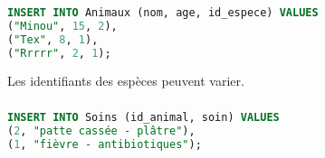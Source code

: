 \documentclass[svgnames,11pt]{beamer}
\begin{document}
\begin{frame}[fragile]
    \frametitle{}

\begin{center}
\begin{lstlisting}[language=SQL , basicstyle=\ttfamily\small, xleftmargin=1em, xrightmargin=0em]
INSERT INTO Animaux (nom, age, id_espece) VALUES 
("Minou", 15, 2),
("Tex", 8, 1),
("Rrrrr", 2, 1);
\end{lstlisting}
\label{CODE}
\end{center}
\begin{aretenir}[Remarque]
Les identifiants des espèces peuvent varier.
\end{aretenir}
\end{frame}
\begin{frame}[fragile]
    \frametitle{}

\begin{center}
\begin{lstlisting}[language=SQL , basicstyle=\ttfamily\small, xleftmargin=1em, xrightmargin=0em]
INSERT INTO Soins (id_animal, soin) VALUES 
(2, "patte cassée - plâtre"),
(1, "fièvre - antibiotiques");
\end{lstlisting}
\label{CODE}
\end{center}

\end{frame}
\end{document}
